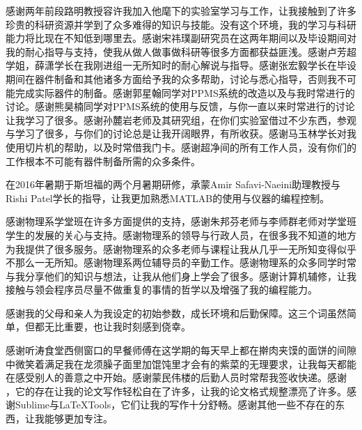 
\begin{acknowledgement}
  感谢两年前段路明教授容许我加入他麾下的实验室学习与工作，让我接触到了许多珍贵的科研资源并学到了众多难得的知识与技能。没有这个环境，我的学习与科研能力将比现在不知低到哪里去。感谢宋祎璞副研究员在这两年期间以及毕设期间对我的耐心指导与支持，使我从做人做事做科研等很多方面都获益匪浅。感谢卢芳超学姐，薛潇学长在我刚进组一无所知时的耐心解说与指导。感谢张宏毅学长在毕设期间在器件制备和其他诸多方面给予我的众多帮助，讨论与悉心指导，否则我不可能完成实际器件的制备。感谢郭星翰同学对PPMS系统的改造以及与我时常进行的讨论。感谢熊昊楠同学对PPMS系统的使用与反馈，与你一直以来时常进行的讨论让我学习了很多。感谢孙麓岩老师及其研究组，在你们实验室借过不少东西，参观与学习了很多，与你们的讨论总是让我开阔眼界，有所收获。感谢马玉林学长对我使用切片机的帮助，以及时常借我门卡。感谢超净间的所有工作人员，没有你们的工作根本不可能有器件制备所需的众多条件。

  在2016年暑期于斯坦福的两个月暑期研修，承蒙Amir Safavi-Naeini助理教授与Rishi Patel学长的指导，让我更加熟悉MATLAB的使用与仪器的编程控制。

  感谢物理系学堂班在许多方面提供的支持，感谢朱邦芬老师与李师群老师对学堂班学生的发展的关心与支持。感谢物理系的领导与行政人员，在很多我不知道的地方为我提供了很多服务。感谢物理系的众多老师与课程让我从几乎一无所知变得似乎不那么一无所知。感谢物理系两位辅导员的辛勤工作。感谢物理系的众多同学时常与我分享他们的知识与想法，让我从他们身上学会了很多。感谢计算机辅修，让我接触与领会程序员尽量不做重复的事情的哲学以及增强了我的编程能力。

  感谢我的父母和亲人为我设定的初始参数，成长环境和后勤保障。这三个词虽然简单，但都无比重要，也让我时刻感到侥幸。

  感谢听涛食堂西侧窗口的早餐师傅在这学期的每天早上都在擀肉夹馍的面饼的间隙中微笑着满足我在龙须臊子面里加馄饨里才会有的紫菜的无理要求，让我每天都能在感受别人的善意之中开始。感谢蒙民伟楼的后勤人员时常帮我签收快递。感谢 \thuthesis，它的存在让我的论文写作轻松自在了许多，让我的论文格式规整漂亮了许多。感谢Sublime与LaTeXTools，它们让我的写作十分舒畅。感谢其他一些不存在的东西，让我能够更加专注。

\end{acknowledgement}
